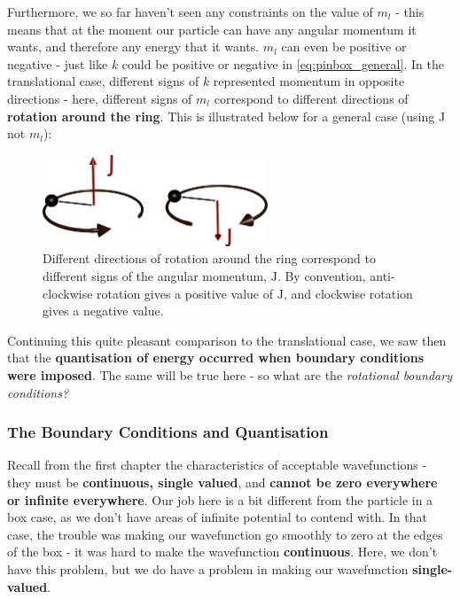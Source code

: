 \documentclass{memoir}[11pt,oneside,a4paper,openany]
\begin{document}
Furthermore, we so far haven't seen any constraints on the value of $m_l$ - this means that at the moment our particle can have any angular momentum it wants, and therefore any energy that it wants. $m_l$ can even be positive or negative - just like $k$ could be positive or negative in \autoref{eq:pinbox_general}. In the translational case, different signs of $k$ represented momentum in opposite directions - here, different signs of $m_l$ correspond to different directions of \textbf{rotation around the ring}. This is illustrated below for a general case (using J not $m_l$): 
\begin{figure}[h]
	\centering
	\includegraphics[width=0.6\textwidth]{angular_momentum_directions}
	\caption{Different directions of rotation around the ring correspond to different signs of the angular momentum, $\mathrm{J}$. By convention, anti-clockwise rotation gives a positive value of $\mathrm{J}$, and clockwise rotation gives a negative value.}
\end{figure}

Continuing this quite pleasant comparison to the translational case, we saw then that the \textbf{quantisation of energy occurred when boundary conditions were imposed}. The same will be true here - so what are the \emph{rotational boundary conditions?}

\subsubsection{The Boundary Conditions and Quantisation}
Recall from the first chapter the characteristics of acceptable wavefunctions - they must be \textbf{continuous, single valued}, and \textbf{cannot be zero everywhere or infinite everywhere}. Our job here is a bit different from the particle in a box case, as we don't have areas of infinite potential to contend with. In that case, the trouble was making our wavefunction go smoothly to zero at the edges of the box - it was hard to make the wavefunction \textbf{continuous}. Here, we don't have this problem, but we do have a problem in making our wavefunction \textbf{single-valued}. 
\end{document}

